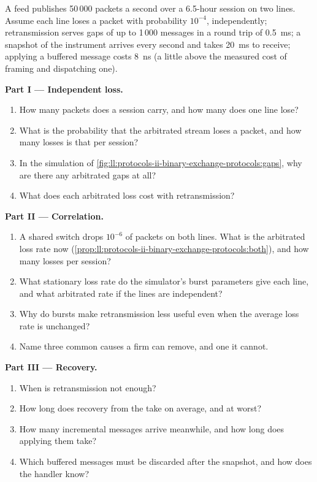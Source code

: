 \begin{problem}\label{pb:ll:protocols-ii-binary-exchange-protocols:1}
A feed publishes 50\,000 packets a second over a 6.5-hour session on two lines. Assume each line loses a packet with probability
$10^{-4}$, independently; retransmission serves gaps of up to 1\,000 messages in a round trip of \qty{0.5}{\milli\second}; a
snapshot of the instrument arrives every second and takes \qty{20}{\milli\second} to receive; applying a buffered message costs
\qty{8}{\nano\second} (a little above the measured cost of framing and dispatching one).

\medskip\noindent\textbf{Part I --- Independent loss.}
\begin{enumerate}
\item How many packets does a session carry, and how many does one line lose?
\item What is the probability that the arbitrated stream loses a packet, and how many losses is that per session?
\item In the simulation of \cref{fig:ll:protocols-ii-binary-exchange-protocols:gaps}, why are there any arbitrated gaps at all?
\item What does each arbitrated loss cost with retransmission?
\end{enumerate}

\medskip\noindent\textbf{Part II --- Correlation.}
\begin{enumerate}[resume]
\item A shared switch drops $10^{-6}$ of packets on both lines. What is the arbitrated loss rate now (\cref{prop:ll:protocols-ii-binary-exchange-protocols:both}), and how many losses per session?
\item What stationary loss rate do the simulator's burst parameters give each line, and what arbitrated rate if the lines are
independent?
\item Why do bursts make retransmission less useful even when the average loss rate is unchanged?
\item Name three common causes a firm can remove, and one it cannot.
\end{enumerate}

\medskip\noindent\textbf{Part III --- Recovery.}
\begin{enumerate}[resume]
\item When is retransmission not enough?
\item How long does recovery from the  take on average, and at worst?
\item How many incremental messages arrive meanwhile, and how long does applying them take?
\item Which buffered messages must be discarded after the snapshot, and how does the handler know?
\end{enumerate}


\end{problem}
